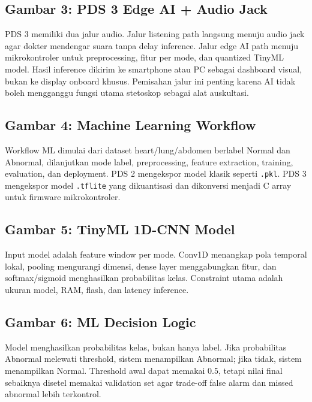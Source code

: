\documentclass[12pt,a4paper]{article}
\begin{document}
\subsection*{Gambar 3: PDS 3 Edge AI + Audio Jack}
PDS 3 memiliki dua jalur audio. Jalur listening path langsung menuju audio jack agar dokter mendengar suara tanpa delay inference. Jalur edge AI path menuju mikrokontroler untuk preprocessing, fitur per mode, dan quantized TinyML model. Hasil inference dikirim ke smartphone atau PC sebagai dashboard visual, bukan ke display onboard khusus. Pemisahan jalur ini penting karena AI tidak boleh mengganggu fungsi utama stetoskop sebagai alat auskultasi.

\subsection*{Gambar 4: Machine Learning Workflow}
Workflow ML dimulai dari dataset heart/lung/abdomen berlabel Normal dan Abnormal, dilanjutkan mode label, preprocessing, feature extraction, training, evaluation, dan deployment. PDS 2 mengekspor model klasik seperti \texttt{.pkl}. PDS 3 mengekspor model \texttt{.tflite} yang dikuantisasi dan dikonversi menjadi C array untuk firmware mikrokontroler.

\subsection*{Gambar 5: TinyML 1D-CNN Model}
Input model adalah feature window per mode. Conv1D menangkap pola temporal lokal, pooling mengurangi dimensi, dense layer menggabungkan fitur, dan softmax/sigmoid menghasilkan probabilitas kelas. Constraint utama adalah ukuran model, RAM, flash, dan latency inference.

\subsection*{Gambar 6: ML Decision Logic}
Model menghasilkan probabilitas kelas, bukan hanya label. Jika probabilitas Abnormal melewati threshold, sistem menampilkan Abnormal; jika tidak, sistem menampilkan Normal. Threshold awal dapat memakai 0.5, tetapi nilai final sebaiknya disetel memakai validation set agar trade-off false alarm dan missed abnormal lebih terkontrol.
\end{document}
